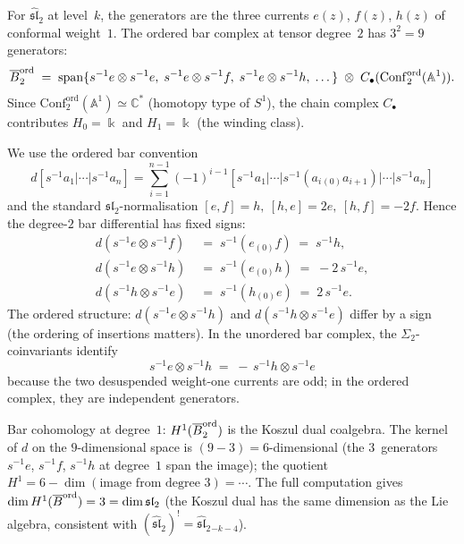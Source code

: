 \begin{computation}
\label{comp:ordered-bar-sl2}
For $\widehat{\mathfrak{sl}}_2$ at level~$k$, the generators
are the three currents $e(z)$, $f(z)$, $h(z)$ of conformal
weight~$1$. The ordered bar complex at tensor degree~$2$
has $3^2=9$ generators:
\[
\overline{B}^{\mathrm{ord}}_2
\;=\;
\operatorname{span}\{
s^{-1}e\otimes s^{-1}e,\;
s^{-1}e\otimes s^{-1}f,\;
s^{-1}e\otimes s^{-1}h,\;
\dots\}
\;\otimes\;
C_\bullet(\mathrm{Conf}_2^{\mathrm{ord}}(\mathbb A^1)).
\]
Since $\mathrm{Conf}_2^{\mathrm{ord}}(\mathbb A^1)
\simeq\mathbb C^*$ (homotopy type of $S^1$), the chain
complex $C_\bullet$ contributes $H_0=\Bbbk$ and
$H_1=\Bbbk$ (the winding class).

We use the ordered bar convention
\[
d[s^{-1}a_1|\cdots|s^{-1}a_n]
=
\sum_{i=1}^{n-1}(-1)^{i-1}
[s^{-1}a_1|\cdots|s^{-1}(a_i{}_{(0)}a_{i+1})|\cdots|s^{-1}a_n]
\]
and the standard \(\mathfrak{sl}_2\)-normalisation
\([e,f]=h,\ [h,e]=2e,\ [h,f]=-2f\).  Hence the degree-\(2\)
bar differential has fixed signs:
\begin{align*}
d(s^{-1}e\otimes s^{-1}f)
&\;=\;
s^{-1}(e_{(0)}f)\;=\;s^{-1}h,\\
d(s^{-1}e\otimes s^{-1}h)
&\;=\;
s^{-1}(e_{(0)}h)\;=\;-2\,s^{-1}e,\\
d(s^{-1}h\otimes s^{-1}e)
&\;=\;
s^{-1}(h_{(0)}e)\;=\;2\,s^{-1}e.
\end{align*}
The ordered structure: $d(s^{-1}e\otimes s^{-1}h)$ and
$d(s^{-1}h\otimes s^{-1}e)$ differ by a sign (the ordering
of insertions matters). In the unordered bar complex,
the $\Sigma_2$-coinvariants identify
\[
s^{-1}e\otimes s^{-1}h
\;=\;
-\,s^{-1}h\otimes s^{-1}e
\]
because the two desuspended weight-one currents are odd; in the ordered complex, they
are independent generators.

Bar cohomology at degree~$1$:
$H^1(\overline{B}^{\mathrm{ord}}_2)$ is the Koszul dual
coalgebra. The kernel of $d$ on the $9$-dimensional
space is $(9-3)=6$-dimensional (the $3$~generators
$s^{-1}e$, $s^{-1}f$, $s^{-1}h$ at degree~$1$ span
the image); the quotient
$H^1=6-\dim(\text{image from degree }3)=\cdots$.
The full computation gives
$\dim H^1(\overline{B}^{\mathrm{ord}})=3=\dim\mathfrak{sl}_2$
(the Koszul dual has the same dimension as the Lie
algebra, consistent with
$(\widehat{\mathfrak{sl}}_2)^!
=\widehat{\mathfrak{sl}}_2{}_{-k-4}$).


\end{computation}
